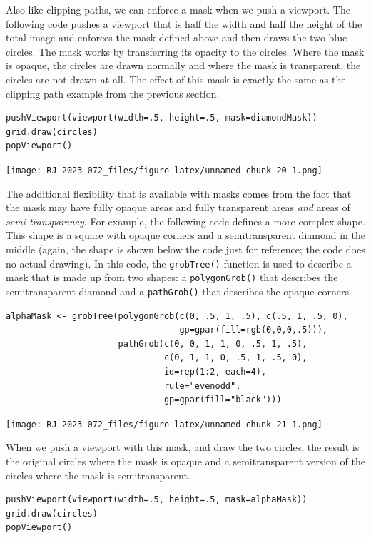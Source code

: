 Also like clipping paths, we can enforce a mask when we push a viewport.
The following code pushes a viewport that is half the width and half the height
of the total image
and enforces the mask defined above and then draws the two blue circles.
The mask works by transferring its opacity to the circles.
Where the mask is opaque, the circles are drawn normally and
where the mask is transparent, the circles are not drawn at all.
The effect of this mask is exactly the same as the clipping path
example from the previous section.

\begin{verbatim}
pushViewport(viewport(width=.5, height=.5, mask=diamondMask))
grid.draw(circles)
popViewport()
\end{verbatim}

\texttt{[image: RJ-2023-072\_files/figure-latex/unnamed-chunk-20-1.png]}

The additional flexibility that is available with masks comes from
the fact that the mask may have fully opaque areas and fully
transparent areas \emph{and} areas of \emph{semi-transparency}.
For example, the following code defines a more complex shape.
This shape is a square with opaque corners and a semitransparent
diamond in the middle (again, the shape is shown below the code
just for reference; the code does no actual drawing).
In this code, the \texttt{grobTree()} function is used to describe a mask
that is made up from two shapes:
a \texttt{polygonGrob()} that describes the semitransparent diamond and
a \texttt{pathGrob()} that describes the opaque corners.

\begin{verbatim}
alphaMask <- grobTree(polygonGrob(c(0, .5, 1, .5), c(.5, 1, .5, 0),
                                  gp=gpar(fill=rgb(0,0,0,.5))),
                      pathGrob(c(0, 0, 1, 1, 0, .5, 1, .5),
                               c(0, 1, 1, 0, .5, 1, .5, 0),
                               id=rep(1:2, each=4),
                               rule="evenodd",
                               gp=gpar(fill="black")))
\end{verbatim}

\texttt{[image: RJ-2023-072\_files/figure-latex/unnamed-chunk-21-1.png]}

When we push a viewport with this mask, and draw the two circles,
the result is the original circles where the mask is opaque
and a semitransparent version of the circles where the mask is
semitransparent.

\begin{verbatim}
pushViewport(viewport(width=.5, height=.5, mask=alphaMask))
grid.draw(circles)
popViewport()
\end{verbatim}

